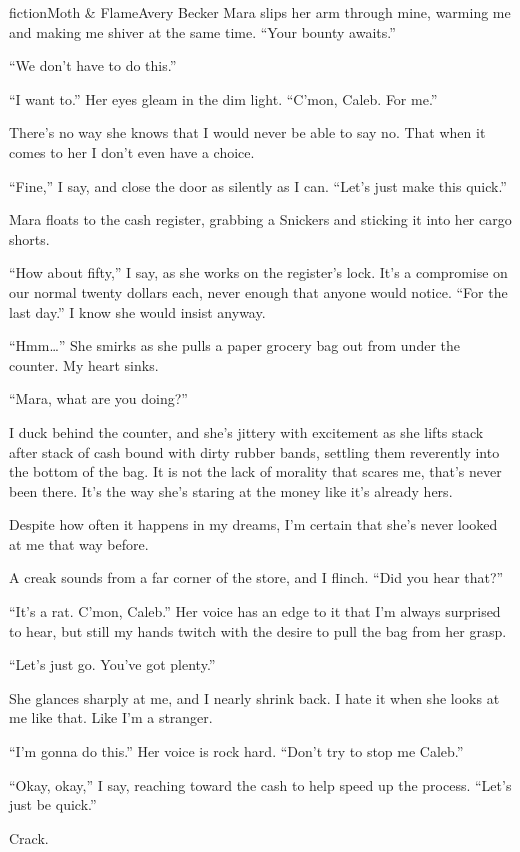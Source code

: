 \begin{prose}{fiction}{Moth \& Flame}{Avery Becker}
Mara slips her arm through mine, warming me and making me shiver at the same time. “Your bounty awaits.” \par
“We don't have to do this.”\par
“I want to.” Her eyes gleam in the dim light. “C'mon, Caleb. For me.” \par
There's no way she knows that I would never be able to say no. That when it comes to her I don't even have a choice.\par
“Fine,” I say, and close the door as silently as I can. “Let's just make this quick.” \par
Mara floats to the cash register, grabbing a Snickers and sticking it into her cargo shorts. \par
“How about fifty,” I say, as she works on the register's lock. It's a compromise on our normal twenty dollars each, never enough that anyone would notice. “For the last day.” I know she would insist anyway. \par
“Hmm…” She smirks as she pulls a paper grocery bag out from under the counter. My heart sinks.\par
“Mara, what are you doing?” \par
I duck behind the counter, and she's jittery with excitement as she lifts stack after stack of cash bound with dirty rubber bands, settling them reverently into the bottom of the bag. It is not the lack of morality that scares me, that's never been there. It's the way she's staring at the money like it's already hers.\par
Despite how often it happens in my dreams, I'm certain that she's never looked at me that way before. \par
A creak sounds from a far corner of the store, and I flinch. “Did you hear that?”\par
“It's a rat. C'mon, Caleb.” Her voice has an edge to it that I'm always surprised to hear, but still my hands twitch with the desire to pull the bag from her grasp.\par
“Let's just go. You've got plenty.” \par
She glances sharply at me, and I nearly shrink back. I hate it when she looks at me like that. Like I'm a stranger. \par
“I'm gonna do this.” Her voice is rock hard. “Don't try to stop me Caleb.” \par
“Okay, okay,” I say, reaching toward the cash to help speed up the process. “Let's just be quick.”\par
Crack.\par

\end{prose}
